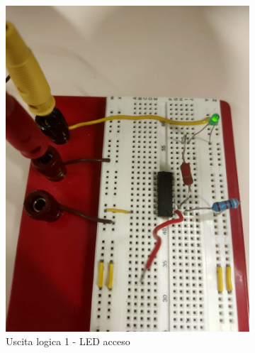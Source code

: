\documentclass[a4paper,12pt]{article}
\begin{document}
\begin{figure}[h]
	\centering
	\begin{subfigure}[b]{0.40\textwidth}
		\centering
		\includegraphics[width=\textwidth]{immagini/inverter/on.png}
		\caption{Uscita logica 1 - LED acceso}
		\label{fig:led_on}
	\end{subfigure}
	\quad
	\begin{subfigure}[b]{0.40\textwidth}
		\centering

\end{subfigure}
\end{figure}
\end{document}
